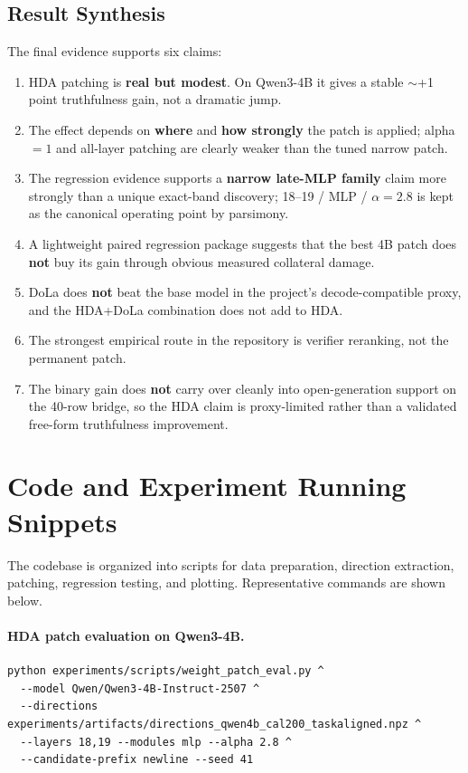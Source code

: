 \documentclass{article}
\begin{document}
\subsection{Result Synthesis}
The final evidence supports six claims:
\begin{enumerate}
\item HDA patching is \textbf{real but modest}. On Qwen3-4B it gives a stable $\sim$+1 point truthfulness gain, not a dramatic jump.
\item The effect depends on \textbf{where} and \textbf{how strongly} the patch is applied; alpha $=1$ and all-layer patching are clearly weaker than the tuned narrow patch.
\item The regression evidence supports a \textbf{narrow late-MLP family} claim more strongly than a unique exact-band discovery; 18--19 / MLP / $\alpha=2.8$ is kept as the canonical operating point by parsimony.
\item A lightweight paired regression package suggests that the best 4B patch does \textbf{not} buy its gain through obvious measured collateral damage.
\item DoLa does \textbf{not} beat the base model in the project's decode-compatible proxy, and the HDA+DoLa combination does not add to HDA.
\item The strongest empirical route in the repository is verifier reranking, not the permanent patch.
\item The binary gain does \textbf{not} carry over cleanly into open-generation support on the 40-row bridge, so the HDA claim is proxy-limited rather than a validated free-form truthfulness improvement.
\end{enumerate}

\section{Code and Experiment Running Snippets}
The codebase is organized into scripts for data preparation, direction extraction, patching, regression testing, and plotting. Representative commands are shown below.

\paragraph{HDA patch evaluation on Qwen3-4B.}
\begin{verbatim}
python experiments/scripts/weight_patch_eval.py ^
  --model Qwen/Qwen3-4B-Instruct-2507 ^
  --directions experiments/artifacts/directions_qwen4b_cal200_taskaligned.npz ^
  --layers 18,19 --modules mlp --alpha 2.8 ^
  --candidate-prefix newline --seed 41
\end{verbatim}
\end{document}
